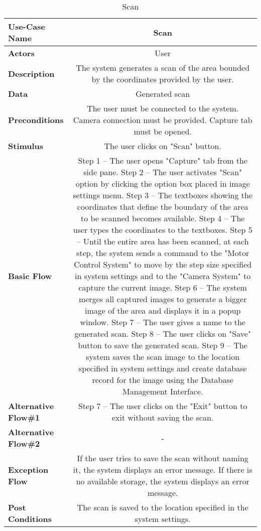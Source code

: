\begin{table}[H]
	\centering
	\begin{tabular}{|l|C|}
		\hline
		\textbf{Use-Case Name} & Scan \\
		\hline
		\textbf{Actors} & User \\ 
		\hline
		\textbf{Description} & The system generates a scan of the area bounded by the coordinates provided by the user.\\ 
		\hline
		\textbf{Data} & Generated scan\\ 
		\hline
		\textbf{Preconditions} & 
		The user must be connected to the system. \newline
		Camera connection must be provided. \newline
		Capture tab must be opened. \\ 
		\hline
		\textbf{Stimulus} & The user clicks on "Scan" button.\\ 
		\hline
		\textbf{Basic Flow} & 
		Step 1 -- The user opens "Capture" tab from the side pane. \newline
		Step 2 -- The user activates "Scan" option by clicking the option box placed in image settings menu. \newline
		Step 3 -- The textboxes showing the coordinates that define the boundary of the area to be scanned becomes available. \newline
		Step 4 -- The user types the coordinates to the textboxes. \newline
		Step 5 -- Until the entire area has been scanned, at each step, the system sends a command to the "Motor Control System" to move by the step size specified in system settings and to the "Camera System" to capture the current image. \newline
		Step 6 -- The system merges all captured images to generate a bigger image of the area and displays it in a popup window. \newline
        Step 7 -- The user gives a name to the generated scan. \newline
		Step 8 -- The user clicks on "Save" button to save the generated scan. \newline
		Step 9 -- The system saves the scan image to the location specified in system settings and create database record for the image using the Database Management Interface. \\
		\hline
		\textbf{Alternative Flow\#1} & 
		Step 7 -- The user clicks on the "Exit" button to exit without saving the scan. \\
		\hline
		\textbf{Alternative Flow\#2} & - \\
		\hline
		\textbf{Exception Flow} & If the user tries to save the scan without naming it, the system displays an error message. If there is no available storage, the system displays an error message.\\
		\hline
		\textbf{Post Conditions} & The scan is saved to the location specified in the system settings. \\ 
		\hline
	\end{tabular}
	\caption{Scan}
	\label{tab:scan}
\end{table}